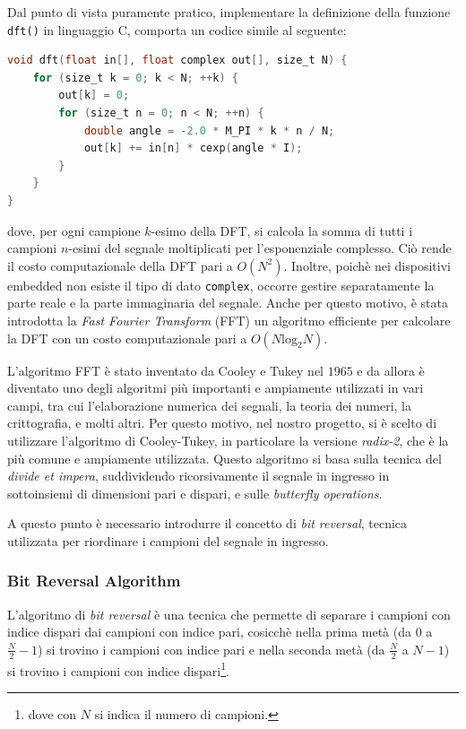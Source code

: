 \documentclass[a4paper,12pt]{report}  %
\newcommand{\lstinlinebg}[1]{\colorbox{backcolour}{\lstinline|#1|}}
\begin{document}
Dal punto di vista puramente pratico, implementare la definizione della funzione \lstinlinebg{dft()} in linguaggio C, comporta un codice simile al seguente:
\begin{lstlisting}[language=C,keywords={void, complex, float, size_t, for, double, cexp, I, M_PI}]
void dft(float in[], float complex out[], size_t N) {
    for (size_t k = 0; k < N; ++k) {
        out[k] = 0;
        for (size_t n = 0; n < N; ++n) {
            double angle = -2.0 * M_PI * k * n / N;
            out[k] += in[n] * cexp(angle * I);
        }
    }
}
\end{lstlisting}
dove, per ogni campione $k$-esimo della DFT, si calcola la somma di tutti i campioni $n$-esimi del segnale moltiplicati per l'esponenziale complesso.
Ciò rende il costo computazionale della DFT pari a $O(N^2)$.
Inoltre, poichè nei dispositivi embedded non esiste il tipo di dato \lstinlinebg{complex}, occorre gestire separatamente la parte reale e la parte immaginaria del segnale.
Anche per questo motivo, è stata introdotta la \textit{Fast Fourier Transform} (FFT) un algoritmo efficiente per calcolare la DFT con un costo computazionale pari a $O(N \text{log}_2 N)$.

L'algoritmo FFT è stato inventato da Cooley e Tukey nel $1965$ e da allora è diventato uno degli algoritmi più importanti e ampiamente utilizzati in vari campi, tra cui l'elaborazione numerica dei segnali, la teoria dei numeri, la crittografia, e molti altri.
Per questo motivo, nel nostro progetto, si è scelto di utilizzare l'algoritmo di Cooley-Tukey, in particolare la versione \textit{radix-2}, che è la più comune e ampiamente utilizzata.
Questo algoritmo si basa sulla tecnica del \textit{divide et impera}, suddividendo ricorsivamente il segnale in ingresso in sottoinsiemi di dimensioni pari e dispari, e sulle \textit{butterfly operations}.

A questo punto è necessario introdurre il concetto di \textit{bit reversal}, tecnica utilizzata per riordinare i campioni del segnale in ingresso.

\subsubsection{Bit Reversal Algorithm}
L'algoritmo di \textit{bit reversal} è una tecnica che permette di separare i campioni con indice dispari dai campioni con indice pari, cosicchè nella prima metà (da $0$ a $\frac{N}{2} - 1$) si trovino i campioni con indice pari e nella seconda metà (da $\frac{N}{2}$ a $N - 1$) si trovino i campioni con indice dispari\footnote{dove con $N$ si indica il numero di campioni.}.
\end{document}
